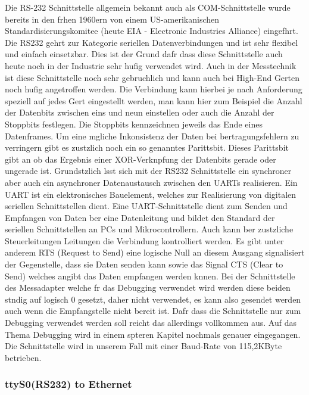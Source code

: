 \documentclass[a4paper]{book}%
\begin{document}
Die RS-232 Schnittstelle allgemein bekannt auch als COM-Schnittstelle wurde bereits in den frhen 1960ern von einem US-amerikanischen Standardisierungskomitee (heute EIA - Electronic Industries Alliance) eingefhrt. Die RS232 gehrt zur Kategorie seriellen Datenverbindungen und ist sehr flexibel und einfach einsetzbar. Dies ist der Grund dafr dass diese Schnittstelle auch heute noch in der Industrie sehr hufig verwendet wird. Auch in der Messtechnik ist diese Schnittstelle noch sehr gebruchlich und kann auch bei High-End Gerten noch hufig angetroffen werden. Die Verbindung kann hierbei je nach Anforderung speziell auf jedes Gert eingestellt werden, man kann hier zum Beispiel die Anzahl der Datenbits zwischen eins und neun einstellen oder auch die Anzahl der Stoppbits festlegen. Die Stoppbits kennzeichnen jeweils das Ende eines Datenframes. Um eine mgliche Inkonsistenz der Daten bei bertragungsfehlern zu verringern gibt es zustzlich noch ein so genanntes Parittsbit. Dieses Parittsbit gibt an ob das Ergebnis einer XOR-Verknpfung der Datenbits gerade oder ungerade ist. Grundstzlich lsst sich mit der RS232 Schnittstelle ein synchroner aber auch ein asynchroner Datenaustausch zwischen den UARTs realisieren.
Ein UART ist ein elektronisches Bauelement, welches zur Realisierung von digitalen seriellen Schnittstellen dient. Eine UART-Schnittstelle dient zum Senden und Empfangen von Daten ber eine Datenleitung und bildet den Standard der seriellen Schnittstellen an PCs und Mikrocontrollern. 
Auch kann ber zustzliche Steuerleitungen Leitungen die Verbindung kontrolliert werden.
Es gibt unter anderem RTS (Request to Send) eine logische Null an diesem Ausgang signalisiert der Gegenstelle, dass sie Daten senden kann sowie das Signal CTS (Clear to Send) welches angibt das Daten empfangen werden knnen. Bei der Schnittstelle des Messadapter welche fr das Debugging verwendet wird werden diese beiden stndig auf logisch 0 gesetzt, daher nicht verwendet, es kann also gesendet werden auch wenn die Empfangstelle nicht bereit ist. Dafr dass die Schnittstelle nur zum Debugging verwendet werden soll reicht das allerdings vollkommen aus. Auf das Thema Debugging wird in einem spteren Kapitel nochmals genauer eingegangen.
Die Schnittstelle wird in unserem Fall mit einer Baud-Rate von 115,2KByte betrieben.



\subsubsection{ttyS0(RS232) to Ethernet}
\end{document}
